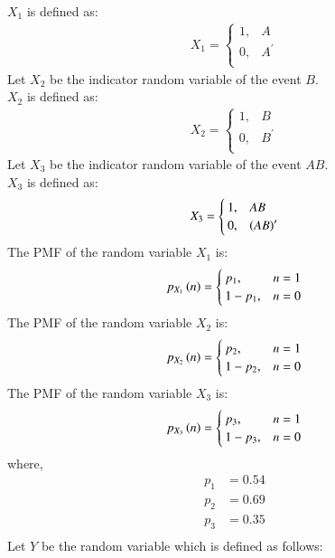 \documentclass[journal]{IEEEtran}
\begin{document}
$X_1$ is defined as:
\begin{align}
	X_1 =
	\begin{cases}
		1 ,& A\\
		0 ,& A^\prime\\
	\end{cases}
\end{align}
Let $X_2$ be the indicator random variable of the event $B$.\\
$X_2$ is defined as:
\begin{align}
	X_2 =
	\begin{cases}
		1 ,& B\\
		0 ,& B^\prime\\
	\end{cases}
\end{align}
Let $X_3$ be the indicator random variable of the event $AB$.\\
$X_3$ is defined as:
\begin{align}
	X_3 =
	\begin{cases}
		1 ,& AB\\
		0 ,& \left(AB\right)^\prime\\
	\end{cases}
\end{align}
The PMF of the random variable $X_1$ is:
\begin{align}
	p_{X_1}\left(n\right) =
	\begin{cases}
		p_1 ,& n = 1\\
		1 - p_1 ,& n = 0
	\end{cases}
\end{align}
The PMF of the random variable $X_2$ is:
\begin{align}
	p_{X_2}\left(n\right) =
	\begin{cases}
		p_2 ,& n = 1\\
		1 - p_2 ,& n = 0
	\end{cases}
\end{align}
The PMF of the random variable $X_3$ is:
\begin{align}
	p_{X_3}\left(n\right) =
	\begin{cases}
		p_3 ,& n = 1\\
		1 - p_3 ,& n = 0
	\end{cases}
\end{align}
where,
\begin{align}
	p_1 &= 0.54\\
	p_2 &= 0.69\\
	p_3 &= 0.35\\
\end{align}
Let $Y$ be the random variable which is defined as follows:
\end{document}
